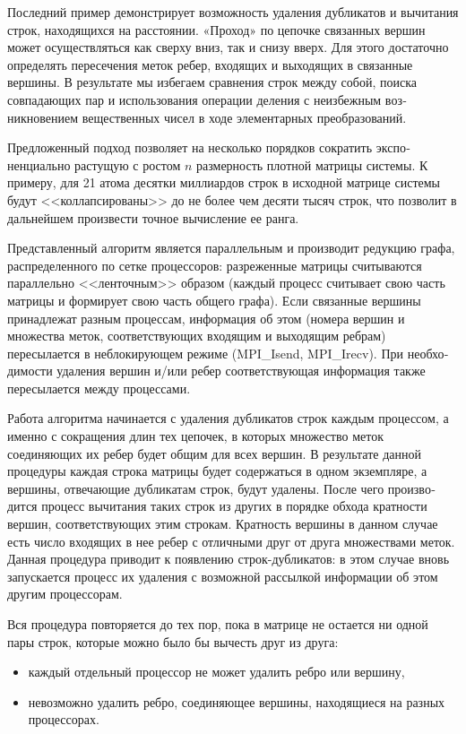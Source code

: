 \clearpage
Последний пример демонстрирует возможность удаления дубликатов и вычитания строк, находящихся на расстоянии. «Проход» по цепочке связанных вершин может осуществляться как сверху вниз, так и снизу вверх. Для это­го достаточно определять пересечения меток ребер, входящих и выходящих в связанные вершины. В результате мы избегаем сравнения строк между собой, поиска совпадающих пар и использования операции деления с неизбежным воз­никновением вещественных чисел в ходе элементарных преобразований.

Предложенный подход позволяет на несколько порядков сократить экспо­ненциально растущую с ростом $n$ размерность плотной матрицы системы. К примеру, для 21 атома десятки миллиардов строк в исходной матрице системы будут <<коллапсированы>> до не более чем десяти тысяч строк, что позволит в дальнейшем произвести точное вычисление ее ранга.

Представленный алгоритм является параллельным и производит редукцию графа, распределенного по сетке процессоров: разреженные матрицы считываются параллельно <<ленточным>> образом (каждый процесс считывает свою часть матрицы и формирует свою часть общего графа). Если связанные вершины принадлежат разным процессам, информация об этом (номера вер­шин и множества меток, соответствующих входящим и выходящим ребрам) пересылается в неблокирующем режиме (MPI\_Isend, MPI\_Irecv). При необхо­димости удаления вершин и/или ребер соответствующая информация также пересылается между процессами.

Работа алгоритма начинается с удаления дубликатов строк каждым про­цессом, а именно с сокращения длин тех цепочек, в которых множество меток соединяющих их ребер будет общим для всех вершин. В результате данной процедуры каждая строка матрицы будет содержаться в одном экземпляре, а вершины, отвечающие дубликатам строк, будут удалены. После чего произво­дится процесс вычитания таких строк из других в порядке обхода кратности вершин, соответствующих этим строкам. Кратность вершины в данном случае есть число входящих в нее ребер с отличными друг от друга множествами ме­ток. Данная процедура приводит к появлению строк-дубликатов: в этом случае вновь запускается процесс их удаления с возможной рассылкой информации об этом другим процессорам.

Вся процедура повторяется до тех пор, пока в матрице не остается ни одной пары строк, которые можно было бы вычесть друг из друга:
\begin{itemize}
\item{каждый отдельный процессор не может удалить ребро или вершину,}
\item{невозможно удалить ребро, соединяющее вершины, находящиеся на раз­ных процессорах.}
\end{itemize}

